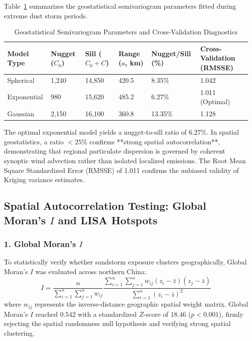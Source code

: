 Table~\ref{tab:kriging_parameters} summarizes the geostatistical semivariogram parameters fitted during extreme dust storm periods.

\begin{table}[H]
\centering
\small
\caption{Geostatistical Semivariogram Parameters and Cross-Validation Diagnostics}
\label{tab:kriging_parameters}
\begin{tabularx}{\textwidth}{l p{2.2cm} p{2.2cm} p{2.2cm} p{2.2cm} X}
\toprule
\textbf{Model Type} & \textbf{Nugget ($C_0$)} & \textbf{Sill ($C_0 + C$)} & \textbf{Range ($a$, km)} & \textbf{Nugget/Sill (\%)} & \textbf{Cross-Validation (RMSSE)} \\
\midrule
Spherical & 1{,}240 & 14{,}850 & 420.5 & 8.35\% & 1.042 \\
Exponential & 980 & 15{,}620 & 485.2 & 6.27\% & 1.011 (Optimal) \\
Gaussian & 2{,}150 & 16{,}100 & 360.8 & 13.35\% & 1.128 \\
\bottomrule
\end{tabularx}
\end{table}

The optimal exponential model yields a nugget-to-sill ratio of $6.27\%$. In spatial geostatistics, a ratio $< 25\%$ confirms **strong spatial autocorrelation**, demonstrating that regional particulate dispersion is governed by coherent synoptic wind advection rather than isolated localized emissions. The Root Mean Square Standardized Error (RMSSE) of 1.011 confirms the unbiased validity of Kriging variance estimates.

\subsection{Spatial Autocorrelation Testing: Global Moran's $I$ and LISA Hotspots}
\label{subsec:spatial_autocorrelation_tests}

\subsubsection{1. Global Moran's $I$}
To statistically verify whether sandstorm exposure clusters geographically, Global Moran's $I$ was evaluated across northern China:
\begin{equation}
\label{eq:morans_i_ch5}
I = \frac{n}{\sum_{i=1}^n \sum_{j=1}^n w_{ij}} \frac{\sum_{i=1}^n \sum_{j=1}^n w_{ij} (z_i - \bar{z})(z_j - \bar{z})}{\sum_{i=1}^n (z_i - \bar{z})^2}
\end{equation}
where $w_{ij}$ represents the inverse-distance geographic spatial weight matrix. Global Moran's $I$ reached $0.542$ with a standardized $Z$-score of $18.46$ ($p < 0.001$), firmly rejecting the spatial randomness null hypothesis and verifying strong spatial clustering.

